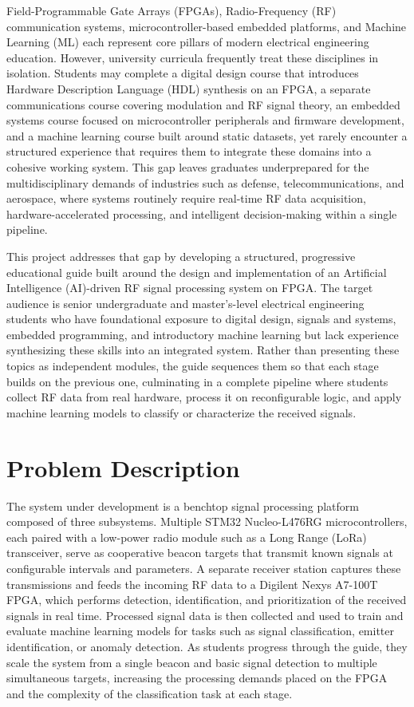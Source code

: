 \documentclass[10pt]{article}
\begin{document}
	Field-Programmable Gate Arrays (FPGAs), Radio-Frequency (RF) communication systems, microcontroller-based embedded platforms, and Machine Learning (ML) each represent core pillars of modern electrical engineering education. However, university curricula frequently treat these disciplines in isolation. Students may complete a digital design course that introduces Hardware Description Language (HDL) synthesis on an FPGA, a separate communications course covering modulation and RF signal theory, an embedded systems course focused on microcontroller peripherals and firmware development, and a machine learning course built around static datasets, yet rarely encounter a structured experience that requires them to integrate these domains into a cohesive working system. This gap leaves graduates underprepared for the multidisciplinary demands of industries such as defense, telecommunications, and aerospace, where systems routinely require real-time RF data acquisition, hardware-accelerated processing, and intelligent decision-making within a single pipeline.
	
	This project addresses that gap by developing a structured, progressive educational guide built around the design and implementation of an Artificial Intelligence (AI)-driven RF signal processing system on FPGA. The target audience is senior undergraduate and master's-level electrical engineering students who have foundational exposure to digital design, signals and systems, embedded programming, and introductory machine learning but lack experience synthesizing these skills into an integrated system. Rather than presenting these topics as independent modules, the guide sequences them so that each stage builds on the previous one, culminating in a complete pipeline where students collect RF data from real hardware, process it on reconfigurable logic, and apply machine learning models to classify or characterize the received signals.
	
	\section{Problem Description}
	
	The system under development is a benchtop signal processing platform composed of three subsystems. Multiple STM32 Nucleo-L476RG microcontrollers, each paired with a low-power radio module such as a Long Range (LoRa) transceiver, serve as cooperative beacon targets that transmit known signals at configurable intervals and parameters. A separate receiver station captures these transmissions and feeds the incoming RF data to a Digilent Nexys A7-100T FPGA, which performs detection, identification, and prioritization of the received signals in real time. Processed signal data is then collected and used to train and evaluate machine learning models for tasks such as signal classification, emitter identification, or anomaly detection. As students progress through the guide, they scale the system from a single beacon and basic signal detection to multiple simultaneous targets, increasing the processing demands placed on the FPGA and the complexity of the classification task at each stage.
	
\end{document}
